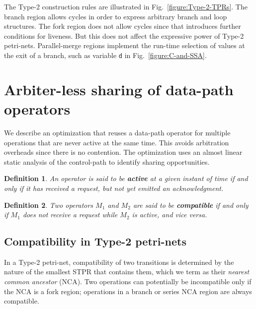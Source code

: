 \documentclass[conference]{IEEEtran}
\newtheorem{definition}{Definition}[section]
\begin{document}
The Type-2 construction rules are illustrated in
Fig.~\ref{figure:Type-2-TPRs}. The branch region allows cycles in
order to express arbitrary branch and loop structures. The fork region
does not allow cycles since that introduces further conditions for
liveness. But this does not affect the expressive power of Type-2
petri-nets. Parallel-merge regions implement the run-time selection of
values at the exit of a branch, such as variable {\tt d} in
Fig.~\ref{figure:C-and-SSA}.

\section{Arbiter-less sharing of data-path operators}

We describe an optimization that reuses a data-path operator for
multiple operations that are never active at the same time. This
avoids arbitration overheads since there is no contention. The
optimization uses an almost linear static analysis of the control-path
to identify sharing opportunities.

\begin{definition} An operator is said to be {\bf active} at a given
instant of time if and only if it has received a request, but not
yet emitted an acknowledgment.
\end{definition}

\begin{definition} Two operators $M_1$ and $M_2$ are said to be {\bf
compatible} if and only if $M_1$ does not receive a request while
$M_2$ is active, and {\it vice versa}.
\end{definition}

\subsection{Compatibility in Type-2 petri-nets}

In a Type-2 petri-net, compatibility of two transitions is determined
by the nature of the smallest STPR that contains them, which we term
as their {\em nearest common ancestor} (NCA). Two operations can
potentially be incompatible only if the NCA is a fork region;
operations in a branch or series NCA region are always compatible.
\end{document}
